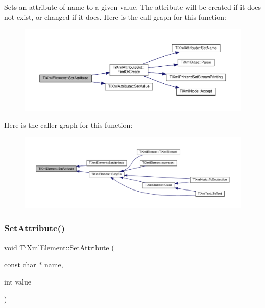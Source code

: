 Sets an attribute of name to a given value. The attribute will be created if it does not exist, or changed if it does. Here is the call graph for this function\+:
\nopagebreak
\begin{figure}[H]
\begin{center}
\leavevmode
\includegraphics[width=350pt]{class_ti_xml_element_abf0b3bd7f0e4c746a89ec6e7f101fc32_cgraph}
\end{center}
\end{figure}
Here is the caller graph for this function\+:
\nopagebreak
\begin{figure}[H]
\begin{center}
\leavevmode
\includegraphics[width=350pt]{class_ti_xml_element_abf0b3bd7f0e4c746a89ec6e7f101fc32_icgraph}
\end{center}
\end{figure}
\mbox{\label{class_ti_xml_element_ace6f4be75e373726d4774073d666d1a7}} 
\subsubsection{\texorpdfstring{Set\+Attribute()}{SetAttribute()}\hspace{0.1cm}{\footnotesize\ttfamily [2/2]}}
{\footnotesize\ttfamily void Ti\+Xml\+Element\+::\+Set\+Attribute (\begin{DoxyParamCaption}\item[{const char $\ast$}]{name,  }\item[{int}]{value }\end{DoxyParamCaption})}

